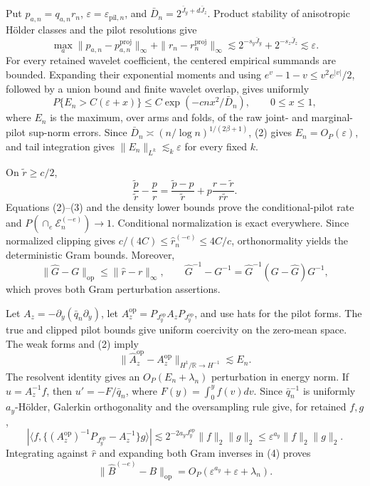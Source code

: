 Put \(p_{a,n}=q_{a,n}r_n\), \(\varepsilon=\varepsilon_{\mathrm{pil},n}\), and \(\bar D_n=2^{\bar J_y+d\bar J_z}\).  Product stability of anisotropic H\"older classes and the pilot resolutions give
\[
\max_a\|p_{a,n}-p_{a,n}^{\mathrm{proj}}\|_\infty
+\|r_n-r_n^{\mathrm{proj}}\|_\infty
\lesssim2^{-s_y\bar J_y}+2^{-s_z\bar J_z}\lesssim\varepsilon. \tag{1}
\]
For every retained wavelet coefficient, the centered empirical summands are bounded.  Expanding their exponential moments and using \(e^v-1-v\le v^2e^{|v|}/2\), followed by a union bound and finite wavelet overlap, gives uniformly
\[
P\{E_n>C(\varepsilon+x)\}\le C\exp(-cnx^2/\bar D_n),\qquad0\le x\le1, \tag{2}
\]
where \(E_n\) is the maximum, over arms and folds, of the raw joint- and marginal-pilot sup-norm errors.  Since \(\bar D_n\asymp(n/\log n)^{1/(2\beta+1)}\), (2) gives \(E_n=O_P(\varepsilon)\), and tail integration gives \(\|E_n\|_{L^k}\lesssim_k\varepsilon\) for every fixed \(k\).

On \(\widetilde r\ge c/2\),
\[
\frac{\widetilde p}{\widetilde r}-\frac pr
=\frac{\widetilde p-p}{\widetilde r}
+p\frac{r-\widetilde r}{r\widetilde r}. \tag{3}
\]
Equations (2)--(3) and the density lower bounds prove the conditional-pilot rate and \(P(\cap_e\mathcal E_n^{(-e)})\to1\).  Conditional normalization is exact everywhere.  Since normalized clipping gives \(c/(4C)\le\widehat r_n^{(-e)}\le4C/c\), orthonormality yields the deterministic Gram bounds.  Moreover,
\[
\|\widehat G-G\|_{\mathrm{op}}\le\|\widehat r-r\|_\infty,
\qquad \widehat G^{-1}-G^{-1}=\widehat G^{-1}(G-\widehat G)G^{-1}, \tag{4}
\]
which proves both Gram perturbation assertions.

Let \(A_z=-\partial_y(\bar q_n\partial_y)\), let \(A_z^{\mathrm{op}}=P_{J_y^{\mathrm{op}}}A_zP_{J_y^{\mathrm{op}}}\), and use hats for the pilot forms.  The true and clipped pilot bounds give uniform coercivity on the zero-mean space.  The weak forms and (2) imply
\[
\|\widehat A_z^{\mathrm{op}}-A_z^{\mathrm{op}}\|_{H^1/\mathbb R\to H^{-1}}
\lesssim E_n. \tag{5}
\]
The resolvent identity gives an \(O_P(E_n+\lambda_n)\) perturbation in energy norm.  If \(u=A_z^{-1}f\), then \(u'=-F/\bar q_n\), where \(F(y)=\int_0^yf(v)dv\).  Since \(\bar q_n^{-1}\) is uniformly \(a_y\)-H\"older, Galerkin orthogonality and the oversampling rule give, for retained \(f,g\),
\[
|\langle f,\{(A_z^{\mathrm{op}})^{-1}P_{J_y^{\mathrm{op}}}-A_z^{-1}\}g\rangle|
\lesssim2^{-2a_yJ_y^{\mathrm{op}}}\|f\|_2\|g\|_2
\le\varepsilon^{a_y}\|f\|_2\|g\|_2. \tag{6}
\]
Integrating against \(\widehat r\) and expanding both Gram inverses in (4) proves
\[
\|\widehat B^{(-e)}-B\|_{\mathrm{op}}
=O_P(\varepsilon^{a_y}+\varepsilon+\lambda_n). \tag{7}
\]

